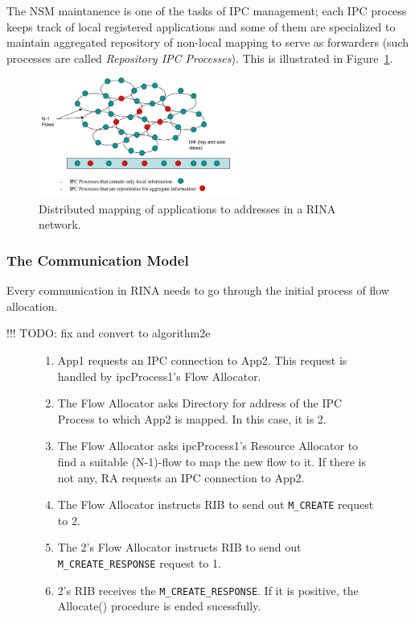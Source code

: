                 The NSM maintanence is one of the tasks of IPC management; each IPC process keeps track of local registered applications and some of them are specialized to maintain aggregated repository of non-local mapping to serve as forwarders (such processes are called \emph{Repository IPC Processes}). This is illustrated in Figure~\ref{fig:rina_nsm}.

                \begin{figure}[H]
                    \begin{center}
                        \includegraphics[width=0.6\textwidth]{fig/archs_rina-nsm.png}
                      \caption{Distributed mapping of applications to addresses in a RINA network.}
                      \label{fig:rina_nsm}
                    \end{center}
                \end{figure}


            \subsubsection{The Communication Model}\label{archs:rina:communication}

                Every communication in RINA needs to go through the initial process of flow allocation.

                !!! TODO: fix and convert to algorithm2e

                \begin{figure}[H]
                    \begin{enumerate}
                        \item App1 requests an IPC connection to App2. This request is handled by ipcProcess1's Flow Allocator.
                        \item The Flow Allocator asks Directory for address of the IPC Process to which App2 is mapped. In this case, it is 2.
                        \item The Flow Allocator asks ipcProcess1's Resource Allocator to find a suitable (N-1)-flow to map the new flow to it. If there is not any, RA requests an IPC connection to App2.
                        \item The Flow Allocator instructs RIB to send out \texttt{M\_CREATE} request to 2.
                        \item The 2's Flow Allocator instructs RIB to send out \texttt{M\_CREATE\_RESPONSE} request to 1.
                        \item 2's RIB receives the \texttt{M\_CREATE\_RESPONSE}. If it is positive, the Allocate() procedure is ended sucessfully.
                    \end{enumerate}
                \end{figure}

